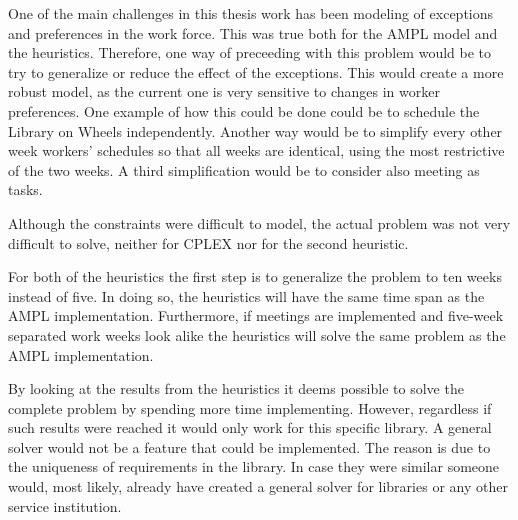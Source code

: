 One of the main challenges in this thesis work has been modeling of exceptions and preferences in the work force. This was true both for the AMPL model and the heuristics. Therefore, one way of preceeding with this problem would be to try to generalize or reduce the effect of the exceptions. This would create a more robust model, as the current one is very sensitive to  changes in worker preferences. One example of how this could be done could be to schedule the Library on Wheels independently. Another way would be to simplify every other week workers' schedules so that all weeks are identical, using the most restrictive of the two weeks. A third simplification would be to consider also meeting as tasks. 

Although the constraints were difficult to model, the actual problem was not very difficult to solve, neither for CPLEX nor for the second heuristic.  


For both of the heuristics the first step is to generalize the problem to ten weeks instead of five. In doing so, the heuristics will have the same time span as the AMPL implementation. Furthermore, if meetings are implemented and five-week separated work weeks look alike the heuristics will solve the same problem as the AMPL implementation. 

By looking at the results from the heuristics it deems possible to solve the complete problem by spending more time implementing. However, regardless if such results were reached it would only work for this specific library. A general solver would not be a feature that could be implemented. The reason is due to the uniqueness of requirements in the library. In case they were similar someone would, most likely, already have created a general solver for libraries or any other service institution.
